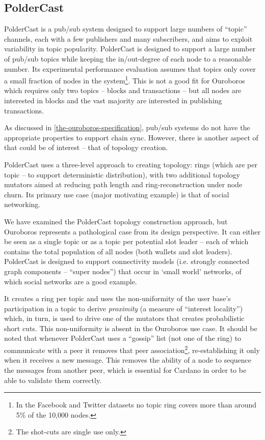 \documentclass[11pt,a4paper]{article}
\begin{document}
\subsection{PolderCast}
\label{poldercast-1}

PolderCast \cite{SSVV12} is a pub/sub system designed to support large
numbers of ``topic'' channels, each with a few publishers and many
subscribers, and aims to exploit variability in topic popularity.
PolderCast is designed to support a large number of pub/sub topics while
keeping the in/out-degree of each node to a reasonable number. Its
experimental performance evaluation assumes that topics only cover a
small fraction of nodes in the system\footnote{In the Facebook and
  Twitter datasets no topic ring covers more than around 5\% of the
  10,000 nodes.}. This is not a good fit for Ouroboros which requires
only two topics -- blocks and transactions -- but all nodes are
interested in blocks and the vast majority are interested in publishing
transactions.

As discussed in \cref{the-ouroboros-specification}, pub/sub systems
do not have the appropriate properties to support chain sync. However,
there is another aspect of that could be of interest -- that of topology
creation.

PolderCast uses a three-level approach to creating topology: rings
(which are per topic -- to support deterministic distribution), with two
additional topology mutators aimed at reducing path length and
ring-reconstruction under node churn. Its primary use case (major
motivating example) is that of social networking.

We have examined the PolderCast topology construction approach, but
Ouroboros represents a pathological case from its design perspective. It
can either be seen as a single topic or as a topic per potential slot
leader -- each of which contains the total population of all nodes (both
wallets and slot leaders). PolderCast is designed to support
connectivity models (i.e. strongly connected graph components -- ``super
nodes'') that occur in `small world' \cite{Watts99} networks, of which
social networks are a good example.

It creates a ring per topic and uses the non-uniformity of the user
base's participation in a topic to derive \emph{proximity} (a measure of
``interest locality'') which, in turn, is used to drive one of the
mutators that creates probabilistic short cuts. This non-uniformity is
absent in the Ouroboros use case. It should be noted \cite[Section 5.4]{SSVV12}
that whenever PolderCast uses a ``gossip'' list (not one of the ring) to
communicate with a peer it removes that peer association\footnote{The
  shot-cuts are single use only.}, re-establishing it only when it
receives a new message. This removes the ability of a node to sequence
the messages from another peer, which is essential for Cardano in order
to be able to validate them correctly.
\end{document}
